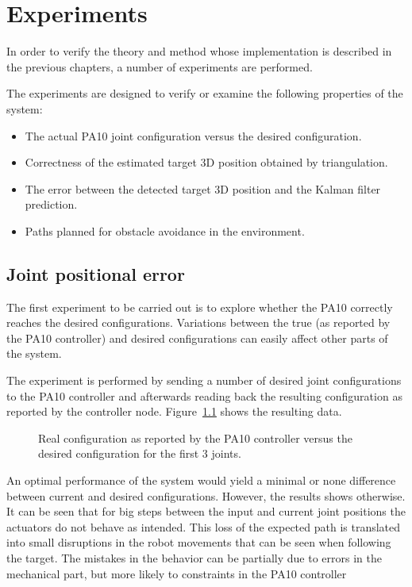 \chapter{Experiments}
\label{cha:experiments}
In order to verify the theory and method whose implementation is described in the previous chapters, a number of experiments are performed.

The experiments are designed to verify or examine the following properties of the system:
\begin{itemize}
    \item The actual PA10 joint configuration versus the desired configuration.
    \item Correctness of the estimated target 3D position obtained by triangulation. %
    \item The error between the detected target 3D position and the Kalman filter prediction.
    \item Paths planned for obstacle avoidance in the environment.
\end{itemize}


\section{Joint positional error}\label{sec:joint_error}
The first experiment to be carried out is to explore whether the PA10 correctly reaches the desired configurations.
Variations between the true (as reported by the PA10 controller) and desired configurations can easily affect other parts of the system.

The experiment is performed by sending a number of desired joint configurations to the PA10 controller and afterwards reading back the resulting configuration as reported by the controller node. Figure~\ref{fig:q_real_desired} shows the resulting data.

\begin{figure}[htb]
    \centering
    \resizebox{.8\columnwidth}{!}{%
        
    }
    \caption{Real configuration as reported by the PA10 controller versus the desired configuration for the first 3 joints.}
    \label{fig:q_real_desired}
\end{figure}


An optimal performance of the system would yield a minimal or none difference between current and desired configurations.
However, the results shows otherwise.
It can be seen that for big steps between the input and current joint positions the actuators do not behave as intended.
This loss of the expected path is translated into small disruptions in the robot movements that can be seen when following the target.
The mistakes in the behavior can be partially due to errors in the mechanical part, but more likely to constraints in the PA10 controller

